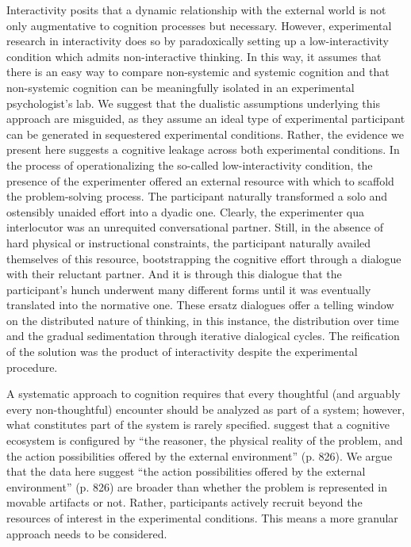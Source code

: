 \documentclass[twocolumn, serif, empirical, authordate]{jote-article}
\begin{document}
{{Interactivity posits that a dynamic relationship with the external world is not only augmentative to cognition processes but necessary. However, experimental research in interactivity does so by paradoxically setting up a low-interactivity condition which admits non-interactive thinking.
In this way, it assumes that there is an easy way to compare non-systemic and systemic cognition and that non-systemic cognition can be meaningfully isolated in an experimental psychologist's lab. We suggest that the dualistic assumptions underlying this approach are misguided, as they assume an ideal type of experimental participant can be generated in sequestered experimental conditions. Rather, the evidence we present here suggests a cognitive leakage across both experimental conditions. In the process of operationalizing the so-called low-interactivity condition, the presence of the experimenter offered an external resource with which to scaffold the problem-solving process. The participant naturally transformed a solo and ostensibly unaided effort into a dyadic one. Clearly, the experimenter qua interlocutor was an unrequited conversational partner. Still, in the absence of hard physical or instructional constraints, the participant naturally availed themselves of this resource, bootstrapping the cognitive effort through a dialogue with their reluctant partner. And it is through this dialogue that the participant's hunch underwent many different forms until it was eventually translated into the normative one. These ersatz dialogues offer a telling window on the distributed nature of thinking, in this instance, the distribution over time and the gradual sedimentation through iterative dialogical cycles. The reification of the solution was the product of interactivity despite the experimental procedure.

A systematic approach to cognition requires that every thoughtful (and arguably every non-thoughtful) encounter should be analyzed as part of a system; however, what constitutes part of the system is rarely specified. \textcite{Vallée-Tourangeau2020} suggest that a cognitive ecosystem is configured by ``the reasoner, the physical reality of the problem, and the action possibilities offered by the external environment'' (p. 826). We argue that the data here suggest ``the action possibilities offered by the external environment'' (p. 826) are broader than whether the problem is represented in movable artifacts or not.
Rather, participants actively recruit beyond the resources of interest in the experimental conditions. This means a more granular approach needs to be considered.


}}
\end{document}
